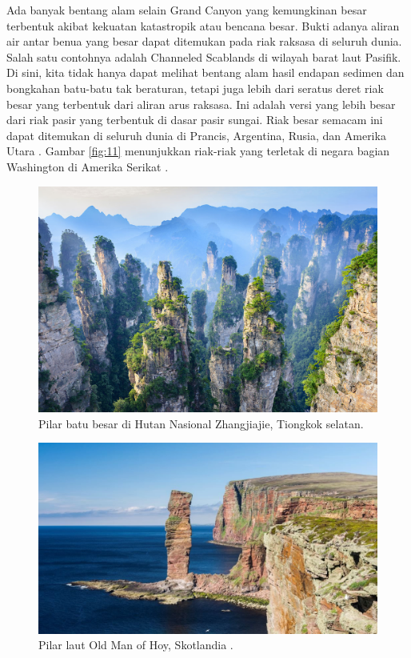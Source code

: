 \documentclass[10pt,twocolumn,letterpaper]{article}
\begin{document}
Ada banyak bentang alam selain Grand Canyon yang kemungkinan besar terbentuk akibat kekuatan katastropik atau bencana besar. Bukti adanya aliran air antar benua yang besar dapat ditemukan pada riak raksasa di seluruh dunia. Salah satu contohnya adalah Channeled Scablands di wilayah barat laut Pasifik. Di sini, kita tidak hanya dapat melihat bentang alam hasil endapan sedimen dan bongkahan batu-batu tak beraturan, tetapi juga lebih dari seratus deret riak besar yang terbentuk dari aliran arus raksasa\cite{78,79}. Ini adalah versi yang lebih besar dari riak pasir yang terbentuk di dasar pasir sungai. Riak besar semacam ini dapat ditemukan di seluruh dunia di Prancis, Argentina, Rusia, dan Amerika Utara \cite{81}. Gambar \ref{fig:11} menunjukkan riak-riak yang terletak di negara bagian Washington di Amerika Serikat \cite{80}.
\begin{figure}[b]
\begin{center}
   \includegraphics[width=1\linewidth]{zhangjiajie.jpg}
\end{center}
   \caption{Pilar batu besar di Hutan Nasional Zhangjiajie, Tiongkok selatan.}
\label{fig:12}
\label{fig:onecol}
\end{figure}

\begin{figure}[b]
\begin{center}
   \includegraphics[width=1\linewidth]{hoy.jpg}
\end{center}
   \caption{Pilar laut Old Man of Hoy, Skotlandia \cite{83}.}
\label{fig:13}
\label{fig:onecol}
\end{figure}
\end{document}
